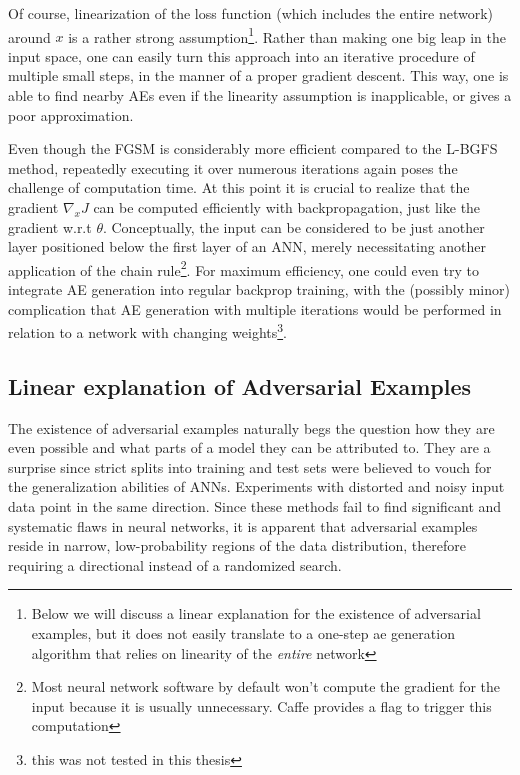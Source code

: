 \documentclass[11pt, a4paper]{article}
\begin{document}
Of course, linearization of the loss function (which includes the entire network) around $x$ is a rather strong assumption\footnote{Below we will discuss a linear explanation for the existence of adversarial examples, but it does not easily translate to a one-step ae generation algorithm that relies on linearity of the \emph{entire} network}. Rather than making one big leap in the input space, one can easily turn this approach into an iterative procedure of multiple small steps, in the manner of a proper gradient descent. This way, one is able to find nearby AEs even if the linearity assumption is inapplicable, or gives a poor approximation.


Even though the FGSM is considerably more efficient compared to the L-BGFS method, repeatedly executing it over numerous iterations again poses the challenge of computation time. At this point it is crucial to realize that the gradient $\nabla_x J$ can be computed efficiently with backpropagation, just like the gradient w.r.t $\theta$. Conceptually, the input can be considered to be just another layer positioned below the first layer of an ANN, merely necessitating another application of the chain rule\footnote{Most neural network software by default won't compute the gradient for the input because it is usually unnecessary. Caffe provides a flag to trigger this computation}. For maximum efficiency, one could even try to integrate AE generation into regular backprop training, with the (possibly minor) complication that AE generation with multiple iterations would be performed in relation to a network with changing weights\footnote{this was not tested in this thesis}.

\subsection{Linear explanation of Adversarial Examples}
\label{subsec:ae-linear-explanation}
The existence of adversarial examples naturally begs the question how they are even possible and what parts of a model they can be attributed to. They are a surprise since strict splits into training and test sets were believed to vouch for the generalization abilities of ANNs. Experiments with distorted and noisy input data point in the same direction. Since these methods fail to find significant and systematic flaws in neural networks, it is apparent that adversarial examples reside in narrow, low-probability regions of the data distribution, therefore requiring a directional instead of a randomized search.
\end{document}
